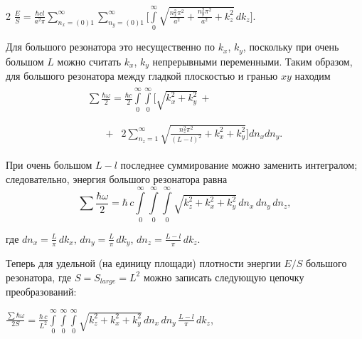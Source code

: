 \documentclass[twoside, 10pt]{article}
\begin{document}
\begin{multicols}{2}
\noindent
    \(\frac{E}{S} = \frac{\hbar c l}{a^2 \pi} \sum\limits_{n_x=(0)1}^{\infty}
\sum\limits_{n_y=(0)1}^{\infty}\Bigg[\int\limits_{0}^{\infty}\sqrt{\frac{n_x^2\pi^2}{a^2}+\frac{n_y^2\pi^2}{a^2}+k_z^2}\,dk_z\Bigg]\).

    Для большого резонатора это несущественно по \(k_x\), \(k_y\), поскольку при очень большом \(L\) можно считать \(k_x\), \(k_y\) непрерывными переменными. Таким образом, для большого резонатора между гладкой плоскостью и гранью \(xy\) находим
\noindent
\begin{equation}\begin{array}{l}
\begin{array}{ll}
\sum\frac{\hbar\omega}{2} = \frac{\hbar c}{2}\int\limits_{0}^{\infty}\int\limits_{0}^{\infty}\Bigg[\sqrt{k_x^2+k_y^2}\,+ & \,\\
\end{array} \\
\begin{array}{rr}
\,\,\,\,\,\,\,\,\,\,\,+ & 2\sum\limits_{n_z=1}^{\infty}\sqrt{\frac{n_z^2 \pi^2}{(L-l)^2}+k_x^2+k_y^2}\Bigg]d{n_x}d{n_y}.\end{array}
\end{array}\end{equation}


При очень большом \(L-l\) последнее суммирование можно заменить интегралом; следовательно, энергия большого резонатора равна
\noindent
\begin{equation}\sum\frac{\hbar\omega}{2} = \hbar\,c\int\limits_{0}^{\infty}\int\limits_{0}^{\infty}\int\limits_{0}^{\infty}\sqrt{k_z^2+k_x^2+k_y^2}\,d{n_x}\,d{n_y}\,d{n_z},\end{equation}

где \(dn_x = \frac{L}{\pi}\,dk_x\), \(dn_y = \frac{L}{\pi}\,dk_y\),
\(dn_z = \frac{L-l}{\pi}\,dk_z\).

    Теперь для удельной (на единицу площади) плотности энергии \(E/S\) большого резонатора, где
\(S = S_{large} = L^2\) можно записать следующую цепочку преобразований:

\noindent
\(\frac{\sum\hbar\omega}{2 S} = \frac{\hbar\,c}{L^2}\int\limits_{0}^{\infty}\int\limits_{0}^{\infty}\int\limits_{0}^{\infty}\sqrt{k_z^2+k_x^2+k_y^2}\,dn_x\,dn_y\,\frac{L-l}{\pi}\,dk_z\),


\end{multicols}
\end{document}
